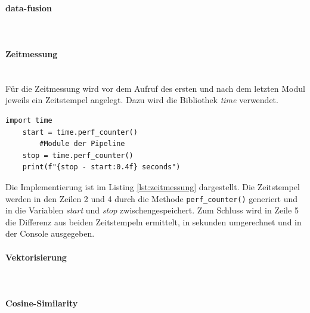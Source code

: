 \paragraph{data-fusion}\mbox{}\\

\paragraph{Zeitmessung}\mbox{}\\
Für die Zeitmessung wird vor dem Aufruf des ersten und nach dem letzten Modul jeweils ein Zeitstempel angelegt. Dazu wird die Bibliothek \emph{time} verwendet.
\begin{lstlisting}[caption={Implementation der Zeitmessung}, label=lst:zeitmessung]
	import time
	start = time.perf_counter()
		#Module der Pipeline
	stop = time.perf_counter()
	print(f"{stop - start:0.4f} seconds")
\end{lstlisting}
Die Implementierung ist im Listing \ref{lst:zeitmessung} dargestellt. Die Zeitstempel werden in den Zeilen 2 und 4 durch die Methode \lstinline{perf_counter()}
generiert und in die Variablen \emph{start} und \emph{stop} zwischengespeichert. Zum Schluss wird in Zeile 5 die Differenz aus beiden Zeitstempeln ermittelt, in sekunden umgerechnet und in der Console ausgegeben.
\paragraph{Vektorisierung}\mbox{}\\

\paragraph{Cosine-Similarity}\mbox{}\\